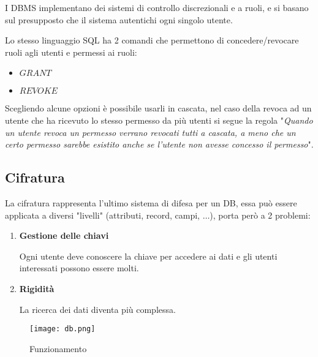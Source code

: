 \documentclass{article}
\begin{document}
I DBMS implementano dei sistemi di controllo discrezionali e a ruoli, e si basano sul presupposto che il sistema autentichi ogni singolo utente.\newline

\noindent Lo stesso linguaggio SQL ha 2 comandi che permettono di concedere/revocare ruoli agli utenti e permessi ai ruoli:
\begin{itemize}
    \item $GRANT$
    \item $REVOKE$\newline
\end{itemize}

\noindent Scegliendo alcune opzioni è possibile usarli in cascata, nel caso della revoca ad un utente che ha ricevuto lo stesso permesso da più utenti si segue la regola "\textit{Quando un utente revoca un permesso verrano revocati tutti a cascata, a meno che un certo permesso sarebbe esistito anche se l'utente non avesse concesso il permesso}".

\newpage

\subsection{Cifratura}

La cifratura rappresenta l'ultimo sistema di difesa per un DB, essa può essere applicata a diversi "livelli" (attributi, record, campi, $\ldots$), porta però a 2 problemi:
\begin{enumerate}
    \item \textbf{Gestione delle chiavi}

        Ogni utente deve conoscere la chiave per accedere ai dati e gli utenti interessati possono essere molti.
    
    \item \textbf{Rigidità}

        La ricerca dei dati diventa più complessa.\newline

\end{enumerate}

\begin{figure}[ht]
    \centering
    \texttt{[image: db.png]}
    \caption{Funzionamento}
\end{figure}
\end{document}
